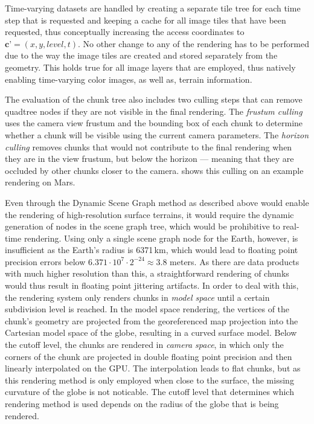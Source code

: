 Time-varying datasets are handled by creating a separate tile tree for each time step that is requested and keeping a cache for all image tiles that have been requested, thus conceptually increasing the access coordinates to $\textbf{c'} = (x,y,level,t)$.  No other change to any of the rendering has to be performed due to the way the image tiles are created and stored separately from the geometry.  This holds true for all image layers that are employed, thus natively enabling time-varying color images, as well as, terrain information.

The evaluation of the chunk tree also includes two culling steps that can remove quadtree nodes if they are not visible in the final rendering.  The \emph{frustum culling} uses the camera view frustum and the bounding box of each chunk to determine whether a chunk will be visible using the current camera parameters.  The \emph{horizon culling} removes chunks that would not contribute to the final rendering when they are in the view frustum, but below the horizon --- meaning that they are occluded by other chunks closer to the camera.   shows this culling on an example rendering on Mars.

Even through the Dynamic Scene Graph method as described above would enable the rendering of high-resolution surface terrains, it would require the dynamic generation of nodes in the scene graph tree, which would be prohibitive to real-time rendering.  Using only a single scene graph node for the Earth, however, is insufficient as the Earth's radius is 6371\,km, which would lead to floating point precision errors below $6.371\cdot 10^7 \cdot 2^{-24} \approx 3.8$ meters.  As there are data products with much higher resolution than this, a straightforward rendering of chunks would thus result in floating point jittering artifacts.  In order to deal with this, the rendering system only renders chunks in \emph{model space} until a certain subdivision level is reached.  In the model space rendering, the vertices of the chunk's geometry are projected from the georeferenced map projection into the Cartesian model space of the globe, resulting in a curved surface model.  Below the cutoff level, the chunks are rendered in \emph{camera space}, in which only the corners of the chunk are projected in double floating point precision and then linearly interpolated on the GPU.  The interpolation leads to flat chunks, but as this rendering method is only employed when close to the surface, the missing curvature of the globe is not noticable.  The cutoff level that determines which rendering method is used depends on the radius of the globe that is being rendered.





